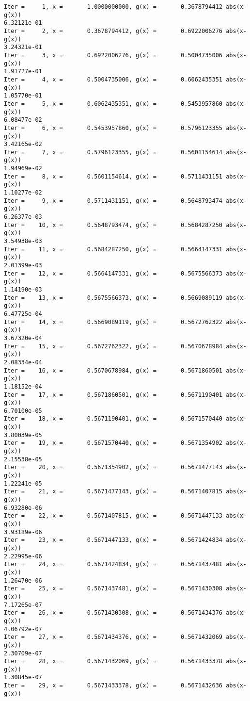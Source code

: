 \documentclass[11pt]{article}
\begin{document}
    \begin{Verbatim}[commandchars=\\\{\}]
Iter =     1, x =       1.0000000000, g(x) =       0.3678794412 abs(x-g(x))
6.32121e-01
Iter =     2, x =       0.3678794412, g(x) =       0.6922006276 abs(x-g(x))
3.24321e-01
Iter =     3, x =       0.6922006276, g(x) =       0.5004735006 abs(x-g(x))
1.91727e-01
Iter =     4, x =       0.5004735006, g(x) =       0.6062435351 abs(x-g(x))
1.05770e-01
Iter =     5, x =       0.6062435351, g(x) =       0.5453957860 abs(x-g(x))
6.08477e-02
Iter =     6, x =       0.5453957860, g(x) =       0.5796123355 abs(x-g(x))
3.42165e-02
Iter =     7, x =       0.5796123355, g(x) =       0.5601154614 abs(x-g(x))
1.94969e-02
Iter =     8, x =       0.5601154614, g(x) =       0.5711431151 abs(x-g(x))
1.10277e-02
Iter =     9, x =       0.5711431151, g(x) =       0.5648793474 abs(x-g(x))
6.26377e-03
Iter =    10, x =       0.5648793474, g(x) =       0.5684287250 abs(x-g(x))
3.54938e-03
Iter =    11, x =       0.5684287250, g(x) =       0.5664147331 abs(x-g(x))
2.01399e-03
Iter =    12, x =       0.5664147331, g(x) =       0.5675566373 abs(x-g(x))
1.14190e-03
Iter =    13, x =       0.5675566373, g(x) =       0.5669089119 abs(x-g(x))
6.47725e-04
Iter =    14, x =       0.5669089119, g(x) =       0.5672762322 abs(x-g(x))
3.67320e-04
Iter =    15, x =       0.5672762322, g(x) =       0.5670678984 abs(x-g(x))
2.08334e-04
Iter =    16, x =       0.5670678984, g(x) =       0.5671860501 abs(x-g(x))
1.18152e-04
Iter =    17, x =       0.5671860501, g(x) =       0.5671190401 abs(x-g(x))
6.70100e-05
Iter =    18, x =       0.5671190401, g(x) =       0.5671570440 abs(x-g(x))
3.80039e-05
Iter =    19, x =       0.5671570440, g(x) =       0.5671354902 abs(x-g(x))
2.15538e-05
Iter =    20, x =       0.5671354902, g(x) =       0.5671477143 abs(x-g(x))
1.22241e-05
Iter =    21, x =       0.5671477143, g(x) =       0.5671407815 abs(x-g(x))
6.93280e-06
Iter =    22, x =       0.5671407815, g(x) =       0.5671447133 abs(x-g(x))
3.93189e-06
Iter =    23, x =       0.5671447133, g(x) =       0.5671424834 abs(x-g(x))
2.22995e-06
Iter =    24, x =       0.5671424834, g(x) =       0.5671437481 abs(x-g(x))
1.26470e-06
Iter =    25, x =       0.5671437481, g(x) =       0.5671430308 abs(x-g(x))
7.17265e-07
Iter =    26, x =       0.5671430308, g(x) =       0.5671434376 abs(x-g(x))
4.06792e-07
Iter =    27, x =       0.5671434376, g(x) =       0.5671432069 abs(x-g(x))
2.30709e-07
Iter =    28, x =       0.5671432069, g(x) =       0.5671433378 abs(x-g(x))
1.30845e-07
Iter =    29, x =       0.5671433378, g(x) =       0.5671432636 abs(x-g(x))

\end{Verbatim}
\end{document}
